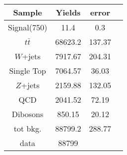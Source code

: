  \begin{center}
 \begin{tabular}{c | c c c|} 
 \hline
   Sample       &  Yields      & error      \\
   \hline
   \hline
        Signal(750)        &   11.4  &     0.3   \\
        \hline
         $t\bar{t}$        &  68623.2      & 137.37   \\%

        \hline
             $W$+jets        &   7917.67      & 204.31     \\

          \hline
       Single Top  & 7064.57       & 36.03\\  
        \hline
             $Z$+jets        &   2159.88      & 132.05     \\
             
         \hline
         QCD        & 2041.52        & 72.19\\

         \hline 
        Dibosons & 850.15     & 20.12\\
        \hline
        \hline

              tot bkg. & 88799.2 & 288.77 \\
        \hline
             data & 88799 & \\
        \hline
\end{tabular}
\end{center}
